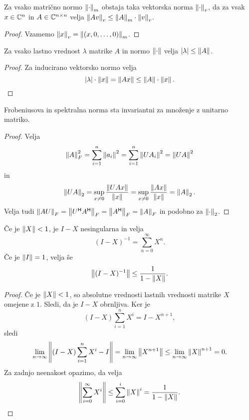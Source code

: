 \begin{lema}
Za vsako matrično normo $\left\lVert \cdot\right\rVert_m$ obstaja taka vektorska
norma $\left\lVert \cdot\right\rVert_v$, da za vsak $x \in \mathbb{C}^n$ in
$A \in \mathbb{C}^{n \times n}$ velja
$\left\lVert Av\right\rVert_v \leq \left\lVert A\right\rVert_m \cdot \left\lVert v\right\rVert_v$.
\end{lema}

\begin{proof}
Vzamemo $\left\lVert x\right\rVert_v = \left\lVert (x,0,\dots,0)\right\rVert_m$.
\end{proof}

\begin{lema}
Za vsako lastno vrednost $\lambda$ matrike $A$ in normo
$\left\lVert \cdot\right\rVert$ velja $\left\lvert \lambda\right\rvert \leq \left\lVert A\right\rVert$.
\end{lema}

\begin{proof}
Za inducirano vektorsko normo velja
\[
\left\lvert \lambda\right\rvert \cdot \left\lVert x\right\rVert =
\left\lVert Ax\right\rVert \leq \left\lVert A\right\rVert \cdot \left\lVert x\right\rVert. \qedhere
\]
\end{proof}

\begin{lema}
Frobeniusova in spektralna norma sta invariantni za množenje z
unitarno matriko.
\end{lema}

\begin{proof}
Velja
\[
\left\lVert A\right\rVert_F^2 = \sum_{i=1}^n \left\lVert a_i\right\rVert^2 =
\sum_{i=1}^n \left\lVert UA_i\right\rVert^2 = \left\lVert UA\right\rVert^2
\]
in
\[
\left\lVert UA\right\rVert_2 = \sup_{x \ne 0} \frac{\left\lVert UAx\right\rVert}{\left\lVert x\right\rVert} =
\sup_{x \ne 0} \frac{\left\lVert Ax\right\rVert}{\left\lVert x\right\rVert} = \left\lVert A\right\rVert_2.
\]
Velja tudi $\left\lVert AU\right\rVert_F = \left\lVert U^\mathsf{H} A^\mathsf{H}\right\rVert_F = 
\left\lVert A^\mathsf{H}\right\rVert_F = \left\lVert A\right\rVert_F$ in podobno za $\left\lVert \cdot\right\rVert_2$.
\end{proof}

\begin{lema}
Če je $\left\lVert X\right\rVert < 1$, je $I-X$ nesingularna in velja
\[
(I-X)^{-1} = \sum_{n=0}^\infty X^n.
\]
Če je $\left\lVert I\right\rVert = 1$, velja še
\[
\left\lVert (I-X)^{-1}\right\rVert \leq \frac{1}{1 - \left\lVert X\right\rVert}.
\]
\end{lema}

\begin{proof}
Če je $\left\lVert X\right\rVert < 1$, so absolutne vrednosti lastnih vrednosti
matrike $X$ omejene z $1$. Sledi, da je $I-X$ obrnljiva. Ker je
\[
(I-X) \sum_{i=1}^n X^i = I - X^{n+1},
\]
sledi
\[
\lim_{n \to \infty} \left\lVert (I-X) \sum_{i=1}^n X^i - I\right\rVert =
\lim_{n \to \infty} \left\lVert X^{n+1}\right\rVert \leq
\lim_{n \to \infty} \left\lVert X\right\rVert^{n+1} = 0.
\]
Za zadnjo neenakost opazimo, da velja
\[
\left\lVert \sum_{i=0}^\infty X^i\right\rVert \leq
\sum_{i=0}^i \left\lVert X\right\rVert^i =
\frac{1}{1 - \left\lVert X\right\rVert}. \qedhere
\]
\end{proof}

